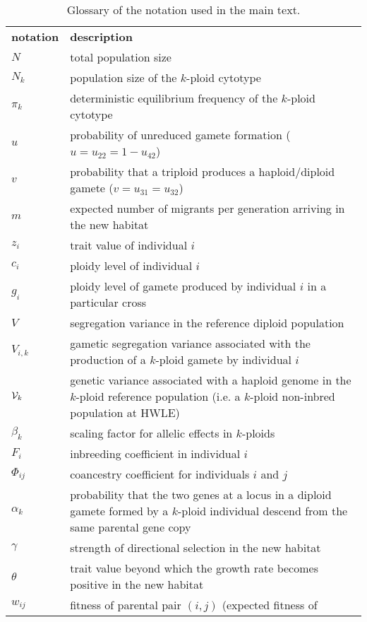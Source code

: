 \documentclass[12pt,a4paper]{article}
\providecommand{\DIFadd}[1]{{\protect\color{blue}\uwave{#1}}} %
\providecommand{\DIFaddFL}[1]{\DIFadd{#1}} %
\providecommand{\DIFaddbeginFL}{} %
\providecommand{\DIFaddendFL}{} %
\begin{document}
    \begin{table}[t]
    \caption{Glossary of the notation used in the main text.
    } \label{tbl:glossary}
    \centering
    \small
    \begin{tabularx}{\linewidth}{lX}
    \cline{1-2}
    \textbf{notation}   & \textbf{description}   \\ \cline{1-2}
    $N$ & total population size\\
    $N_k$ & population size of the $k$-ploid cytotype \\
    $\pi_k$ & deterministic equilibrium frequency of the $k$-ploid cytotype \\
    $u$ & probability of unreduced gamete formation ($u=u_{22}=1-u_{42}$)\\
    $v$ & probability that a triploid produces a haploid/diploid gamete
      ($v=u_{31}=u_{32}$)\\
    $m$ & expected number of migrants per generation arriving in the new habitat \\
    $z_i$ & trait value of individual $i$ \\
    $c_i$ & ploidy level of individual $i$ \\
    $g_i$ & ploidy level of gamete produced by individual $i$ in a particular cross\\
    $V$ & segregation variance in the reference diploid population \\
    $V_{i,k}$ & gametic segregation variance associated with the production of a
      $k$-ploid gamete by individual $i$ \\
    $\mathcal{V}_k$ & genetic variance associated with a haploid genome in the $k$-ploid
      reference population (i.e. a $k$-ploid non-inbred population at HWLE) \\
    $\beta_{k}$ & scaling factor for allelic effects in $k$-ploids \\
    $F_i$ & inbreeding coefficient in individual $i$ \\
    $\Phi_{ij}$ & coancestry coefficient for individuals $i$ and $j$ \\
    $\alpha_k$ & probability that the two genes at a locus in a diploid gamete
      formed by a $k$-ploid individual descend from the same parental gene copy\\
    $\gamma$ & strength of directional selection in the new habitat\\
    $\theta$ & trait value beyond which the growth rate becomes positive in the new
        habitat \\ 
    $w_{ij}$ & fitness of parental pair $(i,j)$ (expected \DIFaddbeginFL \DIFaddFL{zygotic }\DIFaddendFL fitness of

\end{tabularx}
\end{table}
\end{document}
